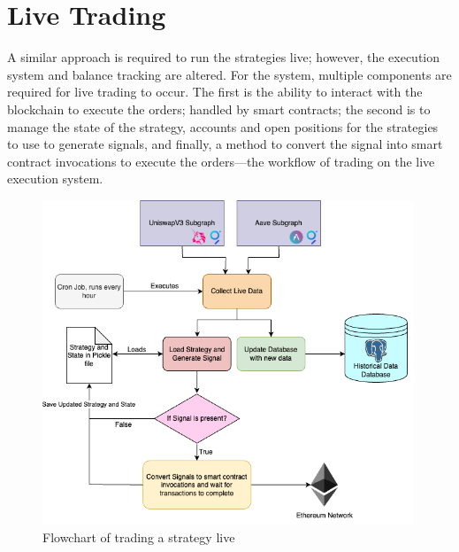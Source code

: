 \section{Live Trading}
A similar approach is required to run the strategies live; however, the execution system and balance tracking are altered. For the system, multiple components are required for live trading to occur. The first is the ability to interact with the blockchain to execute the orders; handled by smart contracts; the second is to manage the state of the strategy, accounts and open positions for the strategies to use to generate signals, and finally, a method to convert the signal into smart contract invocations to execute the orders—the workflow of trading on the live execution system.
\begin{figure}[H]
    \centering
    \includegraphics[width=0.99\textwidth]{project/Images/live-trading-system-diagram.png}
    \caption{Flowchart of trading a strategy live \label{fig:live-flow}}
\end{figure}

